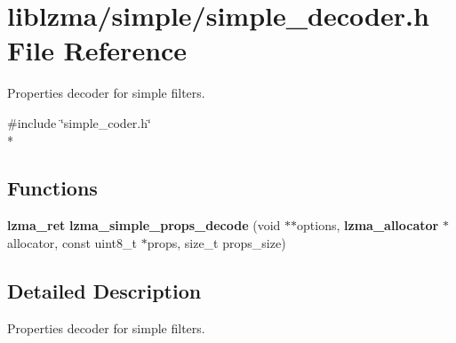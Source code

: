 \section{liblzma/simple/simple\-\_\-decoder.h File Reference}
\label{simple__decoder_8h}


Properties decoder for simple filters.  


{\ttfamily \#include \char`\"{}simple\-\_\-coder.\-h\char`\"{}}\\*
\subsection*{Functions}
\begin{DoxyCompactItemize}
\item 
{\bf lzma\-\_\-ret} {\bfseries lzma\-\_\-simple\-\_\-props\-\_\-decode} (void $\ast$$\ast$options, {\bf lzma\-\_\-allocator} $\ast$allocator, const uint8\-\_\-t $\ast$props, size\-\_\-t props\-\_\-size)\label{simple__decoder_8h_ad9066c7528f3006c61c2d7f0f725cd67}

\end{DoxyCompactItemize}


\subsection{Detailed Description}
Properties decoder for simple filters. 
